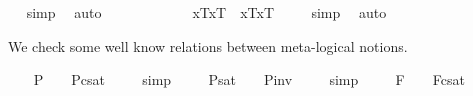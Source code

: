 \begin{isabellebody}
\isadelimproof
\ %
\endisadelimproof
%
\isatagproof
{}\isamarkupfalse%
\ simp\ \isamarkupfalse%
\ auto%
\endisatagproof
{\isafoldproof}%
%
\isadelimproof
%
\endisadelimproof
\ \ \ \ \ \ \ \ \ \isanewline
\ \isamarkupfalse%
\ {\isachardoublequoteopen}{\isacharbrackleft}\isactrlbold {\isasymbox}{\isacharparenleft}\isactrlbold {\isasymforall}x{\isachardot}{\isasymlparr}{\isasymphi}\isactrlsup T{\isacharcomma}x\isactrlsup T{\isasymrparr}{\isacharparenright}\ \isactrlbold {\isasymrightarrow}\ {\isacharparenleft}\isactrlbold {\isasymforall}x{\isachardot}\isactrlbold {\isasymbox}{\isasymlparr}{\isasymphi}\isactrlsup T{\isacharcomma}x\isactrlsup T{\isasymrparr}{\isacharparenright}{\isacharbrackright}\ {\isacharequal}\ {\isasymtop}{\isachardoublequoteclose}%
\isadelimproof
\ %
\endisadelimproof
%
\isatagproof
{}\isamarkupfalse%
\ simp\ \isamarkupfalse%
\ auto%
\endisatagproof
{\isafoldproof}%
%
\isadelimproof
%
\endisadelimproof
%
\isamarkuptrue%
%
\begin{isamarkuptext}%
We check some well know relations between meta-logical notions.%
\end{isamarkuptext}\isamarkuptrue%
\ \isamarkupfalse%
\ \ {\isachardoublequoteopen}{\isacharbrackleft}{\isasymphi}\isactrlsup P{\isacharbrackright}\ {\isacharequal}\ {\isasymtop}\ {\isasymlongleftrightarrow}\ {\isacharbrackleft}{\isasymphi}\isactrlsup P{\isacharbrackright}\isactrlsup c\isactrlsup s\isactrlsup a\isactrlsup t\ {\isacharequal}\ {\isasymbottom}{\isachardoublequoteclose}%
\isadelimproof
\ %
\endisadelimproof
%
\isatagproof
{}\isamarkupfalse%
\ simp\ \isamarkupfalse%
%
\endisatagproof
{\isafoldproof}%
%
\isadelimproof
%
\endisadelimproof
\isanewline
\ \isamarkupfalse%
\ \ {\isachardoublequoteopen}{\isacharbrackleft}{\isasymphi}\isactrlsup P{\isacharbrackright}\isactrlsup s\isactrlsup a\isactrlsup t\ {\isacharequal}\ {\isasymtop}\ {\isasymlongleftrightarrow}\ {\isacharbrackleft}{\isasymphi}\isactrlsup P{\isacharbrackright}\isactrlsup i\isactrlsup n\isactrlsup v\ {\isacharequal}\ {\isasymbottom}{\isachardoublequoteclose}%
\isadelimproof
\ %
\endisadelimproof
%
\isatagproof
{}\isamarkupfalse%
\ simp\ \isamarkupfalse%
%
\endisatagproof
{\isafoldproof}%
%
\isadelimproof
%
\endisadelimproof
\isanewline
\ \isamarkupfalse%
\ \ {\isachardoublequoteopen}{\isacharbrackleft}{\isasymphi}\isactrlsup F{\isacharbrackright}\ {\isacharequal}\ {\isasymtop}\ {\isasymlongleftrightarrow}\ {\isacharbrackleft}{\isasymphi}\isactrlsup F{\isacharbrackright}\isactrlsup c\isactrlsup s\isactrlsup a\isactrlsup t\ {\isacharequal}\ {\isasymbottom}{\isachardoublequoteclose}%

\end{isabellebody}
